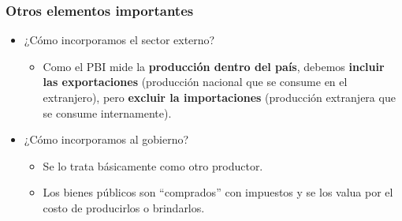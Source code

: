 \documentclass{beamer}
\begin{document}
\begin{frame}
\frametitle{Otros elementos importantes}
\begin{itemize}
        \item ¿Cómo incorporamos el sector externo?
        \begin{itemize}
        \item Como el PBI mide la \textbf{producción dentro del país}, debemos \textbf{incluir las exportaciones} (producción nacional que se consume en el extranjero), pero \textbf{excluir la importaciones} (producción extranjera que se consume internamente).
        \end{itemize} \vspace{1mm}
        \item ¿Cómo incorporamos al gobierno?
        \begin{itemize}
            \item Se lo trata básicamente como otro productor.
            \item Los bienes públicos son “comprados” con impuestos y se los valua por el costo de producirlos o brindarlos.
            \end{itemize}
\end{itemize}
\end{frame}
\end{document}
